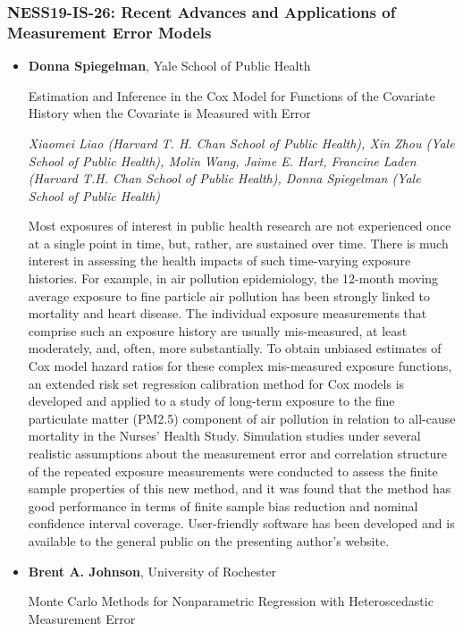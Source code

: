 \subsubsection*{NESS19-IS-26: Recent Advances and Applications of Measurement Error Models}

\begin{itemize}
\item \textbf{Donna Spiegelman}, Yale School of Public Health

Estimation and Inference in the Cox Model for Functions of the Covariate History when the Covariate is Measured with Error

\emph{\footnotesize Xiaomei Liao (Harvard T. H. Chan School of Public Health), Xin Zhou (Yale School of Public Health), Molin Wang, Jaime E. Hart, Francine Laden (Harvard T.H. Chan School of Public Health), Donna Spiegelman (Yale School of Public Health)}

Most exposures of interest in public health research are not experienced once at a single point in time, but, rather, are sustained over time. There is much interest in assessing the health impacts of such time-varying exposure histories. For example, in air pollution epidemiology, the 12-month moving average exposure to fine particle air pollution has been strongly linked to mortality and heart disease. The individual exposure measurements that comprise such an exposure history are usually mis-measured, at least moderately, and, often, more substantially. To obtain unbiased estimates of Cox model hazard ratios for these complex mis-measured exposure functions, an extended risk set regression calibration method for Cox models is developed and applied to a study of long-term exposure to the fine particulate matter (PM2.5) component of air pollution in relation to all-cause mortality in the Nurses’ Health Study. Simulation studies under several realistic assumptions about the measurement error and correlation structure of the repeated exposure measurements were conducted to assess the finite sample properties of this new method, and it was found that the method has good performance in terms of finite sample bias reduction and nominal confidence interval coverage. User-friendly software has been developed and is available to the general public on the presenting author’s website.

\item \textbf{Brent A. Johnson}, University of Rochester

Monte Carlo Methods for Nonparametric Regression with Heteroscedastic Measurement Error


\end{itemize}
